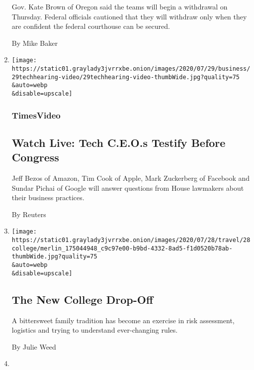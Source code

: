 \begin{enumerate}
  Gov. Kate Brown of Oregon said the teams will begin a withdrawal on
  Thursday. Federal officials cautioned that they will withdraw only
  when they are confident the federal courthouse can be secured.

  By Mike Baker
\item
  \href{/video/us/politics/100000007262236/congress-tech-antitrust-hearings-live.html}{}

  \texttt{[image: https://static01.graylady3jvrrxbe.onion/images/2020/07/29/business/29techhearing-video/29techhearing-video-thumbWide.jpg?quality=75\\\&auto=webp\\\&disable=upscale]}

  \hypertarget{timesvideo}{%
  \subsubsection{TimesVideo}\label{timesvideo}}

  \hypertarget{watch-live-tech-ceos-testify-before-congress}{%
  \subsection{Watch Live: Tech C.E.O.s Testify Before
  Congress}\label{watch-live-tech-ceos-testify-before-congress}}

  Jeff Bezos of Amazon, Tim Cook of Apple, Mark Zuckerberg of Facebook
  and Sundar Pichai of Google will answer questions from House lawmakers
  about their business practices.

  By Reuters
\item
  \href{/2020/07/29/travel/virus-college-travel-restrictions.html}{}

  \texttt{[image: https://static01.graylady3jvrrxbe.onion/images/2020/07/28/travel/28college/merlin\_175044948\_c9c97e00-b9bd-4332-8ad5-f1d0520b78ab-thumbWide.jpg?quality=75\\\&auto=webp\\\&disable=upscale]}

  \hypertarget{the-new-college-drop-off}{%
  \subsection{The New College Drop-Off}\label{the-new-college-drop-off}}

  A bittersweet family tradition has become an exercise in risk
  assessment, logistics and trying to understand ever-changing rules.

  By Julie Weed
\item
  \href{/2020/07/29/health/covid-school-reopening.html}{}


\end{enumerate}
